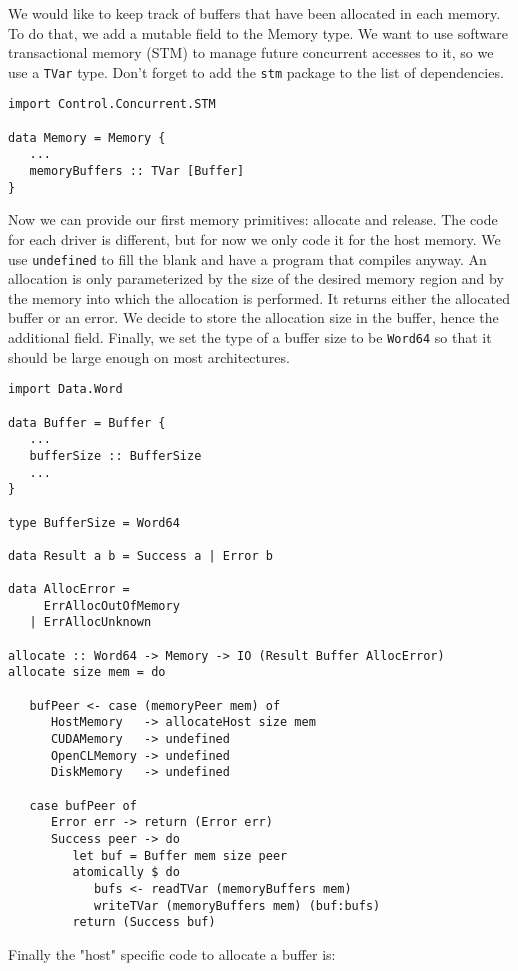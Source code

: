 We would like to keep track of buffers that have been allocated in each memory.
To do that, we add a mutable field to the Memory type. We want to use software
transactional memory (STM) to manage future concurrent accesses to it, so we use
a \texttt{TVar} type. Don't forget to add the \texttt{stm} package to the list
of dependencies.

\begin{lstlisting}
import Control.Concurrent.STM

data Memory = Memory {
   ...
   memoryBuffers :: TVar [Buffer]
}
\end{lstlisting}

Now we can provide our first memory primitives: allocate and release. The code
for each driver is different, but for now we only code it for the host memory.
We use \texttt{undefined} to fill the blank and have a program that compiles
anyway. An allocation is only parameterized by the size of the desired memory
region and by the memory into which the allocation is performed. It returns
either the allocated buffer or an error. We decide to store the allocation size
in the buffer, hence the additional field. Finally, we set the type of a buffer
size to be \texttt{Word64} so that it should be large enough on most
architectures.

\begin{lstlisting}
import Data.Word

data Buffer = Buffer {
   ...
   bufferSize :: BufferSize
   ...
}

type BufferSize = Word64

data Result a b = Success a | Error b

data AllocError = 
     ErrAllocOutOfMemory
   | ErrAllocUnknown

allocate :: Word64 -> Memory -> IO (Result Buffer AllocError)
allocate size mem = do

   bufPeer <- case (memoryPeer mem) of
      HostMemory   -> allocateHost size mem
      CUDAMemory   -> undefined
      OpenCLMemory -> undefined
      DiskMemory   -> undefined

   case bufPeer of
      Error err -> return (Error err)
      Success peer -> do
         let buf = Buffer mem size peer
         atomically $ do
            bufs <- readTVar (memoryBuffers mem)
            writeTVar (memoryBuffers mem) (buf:bufs)
         return (Success buf)
\end{lstlisting}

Finally the "host" specific code to allocate a buffer is:

